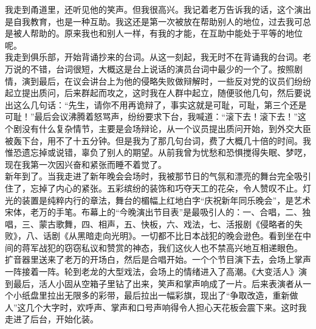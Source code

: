 我走到甬道里，还听见他的笑声。但我很高兴。我记着老万告诉我的话，这个演出是自我教育，也是一种互助。我这还是第一次被放在帮助别人的地位，过去我可总是被人帮助的。原来我也和别人一样，有我的才能，在互助中能处于平等的地位呢。\\

我走到俱乐部，开始背诵抄来的台词。从这一刻起，我无时不在背诵我的台词。老万说的不错，台词很短，大概这是台上说话的演员台词中最少的一个了。按照剧情，演到最后，在议会讲台上为他的侵略失败做辩解时，一些反对党的议员们纷纷起立提出质问，后来群起而攻之，这时我在人群中起立，随便驳他几句，然后要说出这么几句话：“先生，请你不用再诡辩了，事实这就是可耻，可耻，第三个还是可耻！”最后会议沸腾着怒骂声，纷纷要求下台，我喊道：“滚下去！滚下去！”这个剧没有什么复杂情节，主要是会场辩论，从一个议员提出质问开始，到外交大臣被轰下台，用不了十五分钟。但是我为了那几句台词，费了大概几十倍的时间。我惟恐遗忘掉或说错，辜负了别人的期望。从前我曾为忧愁和恐惧搅得失眠、梦呓，现在我第一次因兴奋和紧张而睡不着觉了。\\

新年到了。当我走进了新年晚会会场时，我被那节日的气氛和漂亮的舞台完全吸引住了，忘掉了内心的紧张。五彩缤纷的装饰和巧夺天工的花朵，令人赞叹不止。灯光的装置是纯粹内行的章法，舞台的楣幅上红地白字“庆祝新年同乐晚会”，是艺术宋体，老万的手笔。布幕上的“今晚演出节目表”是最吸引人的：一、合唱，二、独唱，三、蒙古歌舞，四、相声，五、快板，六、戏法，七、活报剧《侵略者的失败》，八、话剧《从黑暗走向光明》。一切都不比日本战犯的晚会逊色。看到坐在中间的蒋军战犯的窃窃私议和赞赏的神态，我们这伙人也不禁高兴地互相递眼色。\\

扩音器里送来了老万的开场白，然后是合唱开始。一个个节目演下去，会场上掌声一阵接着一阵。轮到老龙的大型戏法，会场上的情绪进入了高潮。《大变活人》演到最后，活人小固从空箱子里钻了出来，笑声和掌声响成了一片。后来表演者从一个小纸盘里拉出无限多的彩带，最后拉出一幅彩旗，现出了“争取改造，重新做人”这几个大字时，欢呼声、掌声和口号声响得令人担心天花板会震下来。这时我走进了后台，开始化装。\\

